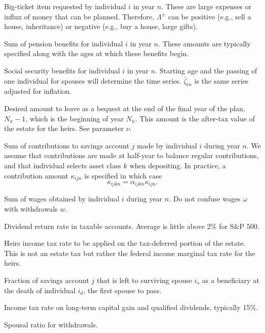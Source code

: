 \documentclass{article}[fleqn,12pt]
\begin{document}
\begin{description}[leftmargin=4em,style=multiline]
\item [$\Lambda^\pm_{in}$]
	Big-ticket item requested by individual $i$ in year $n$.
	These are large expenses or influx of money
	that can be planned. Therefore, $\Lambda^\pm$ can be positive
	(e.g., sell a house, inheritance) or negative (e.g., buy a house, large gifts).
\item [$\pi_{in}$]
	Sum of pension benefits for individual $i$ in year $n$. These amounts are typically
	specified along with the ages at which these benefits begin.
\item [$\zeta_{in}$]
	Social security benefits for individual $i$ in year $n$. Starting age and the passing
	of one individual for spouses will determine the time series. $\bar{\zeta}_{in}$ is
	the same series adjusted for inflation.
\item [$\epsilon_{N_n}$]
	Desired amount to leave as a bequest at the end of the final year of the plan, $N_n-1$,
	which is the beginning of year $N_n$. This amount is the after-tax value of the estate
	for the heirs. See parameter $\nu$.
\item [$\kappa_{ijkn}$]
	Sum of contributions to savings account $j$ made by individual $i$ during year $n$.
	We assume that contributions are made at half-year to balance regular contributions,
	and that individual selects asset class $k$ when depositing. In practice, a contribution
	amount $\kappa_{ijn}$ is specified in which case 
	\begin{equation}
		\kappa_{ijkn} = \alpha_{ijkn}\kappa_{ijn}.
	\end{equation}
\item [$\omega_{in}$]
	Sum of wages obtained by individual $i$ during year $n$.
	Do not confuse wages $\omega$ with withdrawals $w$.
\item [$\mu$]
	Dividend return rate in taxable accounts. Average is little above 2\% for S\&P 500.
\item [$\nu$]
	Heirs income tax rate to be applied on the tax-deferred portion of the estate. This is not an estate tax
	but rather the federal income marginal tax rate for the heirs.
\item [$\phi_j$]
	Fraction of savings account $j$ that is left to surviving spouse $i_s$ as a beneficiary
	at the death of individual $i_d$, the first spouse to pass.
\item [$\psi$]
	Income tax rate on long-term capital gain and qualified dividends, typically 15\%.
\item [$\eta$]
	Spousal ratio for withdrawals.
\end{description}
\end{document}
